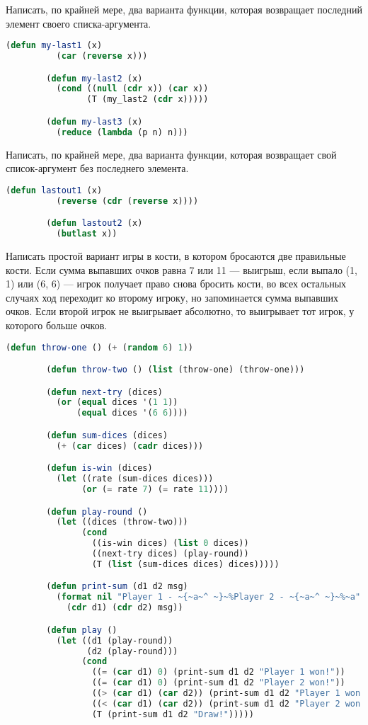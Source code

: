 \documentclass[a4paper,oneside,12pt]{extreport}
\begin{document}
\begin{task}
	Написать, по крайней мере, два варианта функции, которая возвращает последний элемент своего списка-аргумента.

	\begin{lstlisting}[language=Lisp, gobble=16]
		(defun my-last1 (x)
		  (car (reverse x)))

		(defun my-last2 (x)
		  (cond ((null (cdr x)) (car x))
		        (T (my_last2 (cdr x)))))

		(defun my-last3 (x)
		  (reduce (lambda (p n) n)))
	\end{lstlisting}
\end{task}

\begin{task}
	Написать, по крайней мере, два варианта функции, которая возвращает свой список-аргумент без последнего элемента.

	\begin{lstlisting}[language=Lisp, gobble=16]
		(defun lastout1 (x)
		  (reverse (cdr (reverse x))))

		(defun lastout2 (x)
		  (butlast x))
	\end{lstlisting}
\end{task}

\begin{task}
	Написать простой вариант игры в кости, в котором бросаются две правильные кости.
	Если сумма выпавших очков равна 7 или 11 — выигрыш, если выпало (1, 1) или (6, 6) — игрок получает право снова бросить кости, во всех остальных случаях ход переходит ко второму игроку, но запоминается сумма выпавших очков.
	Если второй игрок не выигрывает абсолютно, то выигрывает тот игрок, у которого больше очков.

	\begin{lstlisting}[language=Lisp, gobble=16]
		(defun throw-one () (+ (random 6) 1))

		(defun throw-two () (list (throw-one) (throw-one)))

		(defun next-try (dices)
		  (or (equal dices '(1 1))
		      (equal dices '(6 6))))

		(defun sum-dices (dices)
		  (+ (car dices) (cadr dices)))

		(defun is-win (dices)
		  (let ((rate (sum-dices dices)))
		       (or (= rate 7) (= rate 11))))

		(defun play-round ()
		  (let ((dices (throw-two)))
		       (cond
		         ((is-win dices) (list 0 dices))
		         ((next-try dices) (play-round))
		         (T (list (sum-dices dices) dices)))))

		(defun print-sum (d1 d2 msg)
		  (format nil "Player 1 - ~{~a~^ ~}~%Player 2 - ~{~a~^ ~}~%~a"
		    (cdr d1) (cdr d2) msg))

		(defun play ()
		  (let ((d1 (play-round))
		        (d2 (play-round)))
		       (cond
		         ((= (car d1) 0) (print-sum d1 d2 "Player 1 won!"))
		         ((= (car d1) 0) (print-sum d1 d2 "Player 2 won!"))
		         ((> (car d1) (car d2)) (print-sum d1 d2 "Player 1 won (sum)!"))
		         ((< (car d1) (car d2)) (print-sum d1 d2 "Player 2 won (sum)!"))
		         (T (print-sum d1 d2 "Draw!")))))
	\end{lstlisting}
\end{task}
\end{document}
